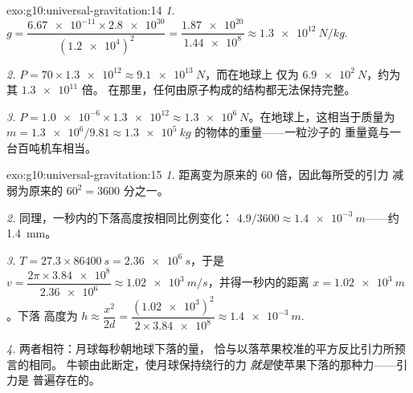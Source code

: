 \begin{solution}{exo:g10:universal-gravitation:14}
\emph{1.} $g = \dfrac{\num{6.67e-11} \times \num{2.8e30}}
{(\num{1.2e4})^2} = \dfrac{\num{1.87e20}}{\num{1.44e8}}
\approx \qty{1.3e12}{N/kg}.$

\emph{2.} $P = 70 \times \num{1.3e12} \approx \qty{9.1e13}{N}$，而在地球上
仅为 $\qty{6.9e2}{N}$，约为其 $\num{1.3e11}$ 倍。
在那里，任何由原子构成的结构都无法保持完整。

\emph{3.} $P = \num{1.0e-6} \times \num{1.3e12} \approx
\qty{1.3e6}{N}$。在地球上，这相当于质量为
$m = \num{1.3e6}/9.81 \approx \qty{1.3e5}{kg}$ 的物体的重量——一粒沙子的
重量竟与一台百吨机车相当。
\end{solution}

\begin{solution}{exo:g10:universal-gravitation:15}
\emph{1.} 距离变为原来的 $60$ 倍，因此每所受的引力
减弱为原来的 $60^2 = 3600$ 分之一。

\emph{2.} 同理，一秒内的下落高度按相同比例变化：
$4.9/3600 \approx \qty{1.4e-3}{m}$——约 \qty{1.4}{mm}。

\emph{3.} $T = 27.3 \times \qty{86400}{s} = \qty{2.36e6}{s}$，于是
$v = \dfrac{2\pi \times \num{3.84e8}}{\num{2.36e6}} \approx
\qty{1.02e3}{m/s}$，并得一秒内的距离 $x = \qty{1.02e3}{m}$。下落
高度为 $h \approx \dfrac{x^2}{2d}
= \dfrac{(\num{1.02e3})^2}{2 \times \num{3.84e8}}
\approx \qty{1.4e-3}{m}$.

\emph{4.} 两者相符：月球每秒朝地球下落的量，
恰与以落苹果校准的平方反比引力所预言的相同。
牛顿由此断定，使月球保持绕行的力
\emph{就是}使苹果下落的那种力——引力是
普遍存在的。
\end{solution}

